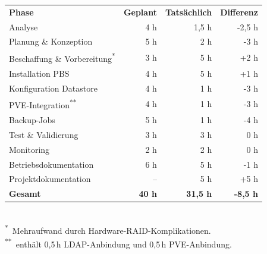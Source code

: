 \begin{tabular}{lrrr}
\rowcolor{heading}\textbf{Phase} & \textbf{Geplant} & \textbf{Tatsächlich} & \textbf{Differenz} \\
Analyse                                            &  4 h & 1{,}5 h & -2{,}5 h \\
\rowcolor{odd}Planung \& Konzeption                &  5 h & 2 h     & -3 h    \\
Beschaffung \& Vorbereitung\textsuperscript{*}     &  3 h & 5 h     & +2 h    \\
\rowcolor{odd}Installation PBS                     &  4 h & 5 h     & +1 h    \\
Konfiguration Datastore                            &  4 h & 1 h     & -3 h    \\
\rowcolor{odd}PVE-Integration\textsuperscript{**}  &  4 h & 1 h     & -3 h    \\
Backup-Jobs                                        &  5 h & 1 h     & -4 h    \\
\rowcolor{odd}Test \& Validierung                  &  3 h & 3 h     &  0 h    \\
Monitoring                                         &  2 h & 2 h     &  0 h    \\
\rowcolor{odd}Betriebsdokumentation                &  6 h & 5 h     & -1 h    \\
Projektdokumentation                               &  -- & 5 h     & +5 h    \\
\hline
\hline
\textbf{Gesamt}                                    & \textbf{40 h} & \textbf{31{,}5 h} & \textbf{-8{,}5 h} \\
\end{tabular}
\\[0.5em]
{\footnotesize
\textsuperscript{*}~Mehraufwand durch Hardware-RAID-Komplikationen.\\
\textsuperscript{**}~enthält 0{,}5\,h LDAP-Anbindung und 0{,}5\,h PVE-Anbindung.}
